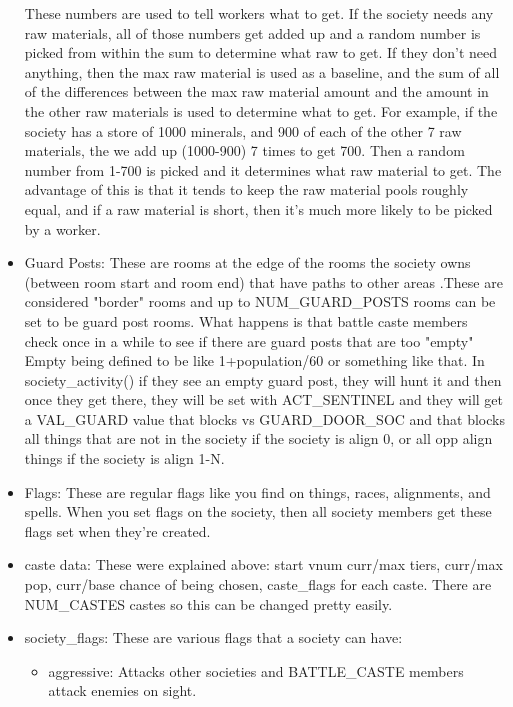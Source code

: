 \begin{itemize}
These numbers are used to tell workers what to get. If the society needs any
raw materials, all of those numbers get added up and a random number is picked
from within the sum to determine what raw to get. If they don't need
anything, then the max raw material is used as a baseline, and the sum of all
of the differences between the max raw material amount and the amount
in the other raw materials is used to determine what to get. For example,
if the society has a store of 1000 minerals, and 900 of each of the
other 7 raw materials, the we add up (1000-900) 7 times to get 700. Then
a random number from 1-700 is picked and it determines what raw
material to get. The advantage of this is that it tends to keep the
raw material pools roughly equal, and if a raw material is short, then
it's much more likely to be picked by a worker.

\item Guard Posts: These are rooms at the edge of the rooms the
society owns (between room start and room end) that have paths
to other areas .These are considered "border" rooms and up to
NUM\_GUARD\_POSTS rooms can be set to be guard post rooms. What happens
is that battle caste members check once in a while to see if there
are guard posts that are too "empty" Empty being defined to be like
1+population/60 or something like that. In society\_activity() if they
see an empty guard post, they will hunt it and then once they
get there, they will be set with ACT\_SENTINEL and they will get
a VAL\_GUARD value that blocks vs GUARD\_DOOR\_SOC and that
blocks all things that are not in the society if the society is align
0, or all opp align things if the society is align 1-N.

\item Flags: These are regular flags like you find on things, races,
alignments, and spells. When you set flags on the society, then all
society members get these flags set when they're created. 

\item caste data: These were explained above: start vnum curr/max tiers,
curr/max pop, curr/base chance of being chosen, caste\_flags for
each caste. There are NUM\_CASTES castes so this can be changed
pretty easily.

\item society\_flags: These are various flags that a society can have:

\begin{itemize}

\item aggressive: Attacks other societies and BATTLE\_CASTE members attack
enemies on sight.


\end{itemize}
\end{itemize}
